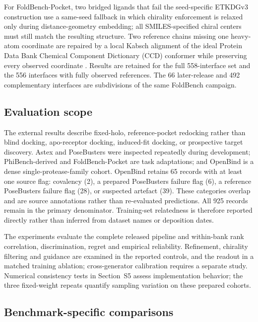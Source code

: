 \documentclass{article}
\newcommand{\citep}[1]{\cite{#1}}
\begin{document}
For FoldBench-Pocket, two bridged ligands that fail the seed-specific ETKDGv3 construction use a same-seed fallback in which chirality enforcement is relaxed only during distance-geometry embedding; all SMILES-specified chiral centers must still match the resulting structure.
Two reference chains missing one heavy-atom coordinate are repaired by a local Kabsch alignment of the ideal Protein Data Bank Chemical Component Dictionary (CCD) conformer while preserving every observed coordinate \citep{kabsch1976rotation,westbrook2015ccd}.
Results are retained for the full 558-interface set and the 556 interfaces with fully observed references.
The 66 later-release and 492 complementary interfaces are subdivisions of the same FoldBench campaign.

\subsection{Evaluation scope}

The external results describe fixed-holo, reference-pocket redocking rather than blind docking, apo-receptor docking, induced-fit docking, or prospective target discovery.
Astex and PoseBusters were inspected repeatedly during development; PhiBench-derived and FoldBench-Pocket are task adaptations; and OpenBind is a dense single-protease-family cohort. OpenBind retains 65 records with at least one source flag: covalency (2), a prepared PoseBusters failure flag (6), a reference PoseBusters failure flag (28), or suspected artefact (39). These categories overlap and are source annotations rather than re-evaluated predictions. All 925 records remain in the primary denominator.
Training-set relatedness is therefore reported directly rather than inferred from dataset names or deposition dates.

The experiments evaluate the complete released pipeline and within-bank rank correlation, discrimination, regret and empirical reliability. Refinement, chirality filtering and guidance are examined in the reported controls, and the readout in a matched training ablation; cross-generator calibration requires a separate study. Numerical consistency tests in Section~S5 assess implementation behavior; the three fixed-weight repeats quantify sampling variation on these prepared cohorts.

\subsection{Benchmark-specific comparisons}
\label{si:literature_context}
\end{document}

